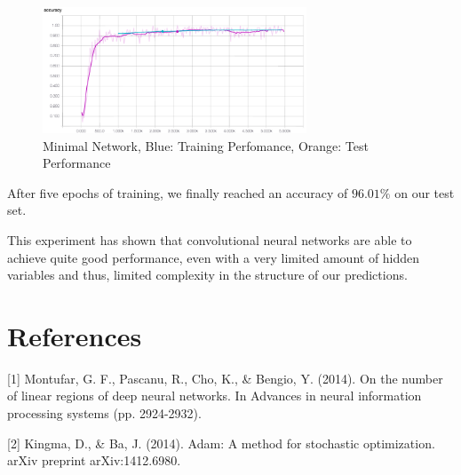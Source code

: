 \documentclass{article}
\begin{document}
\begin{figure}[h]
\centering
\includegraphics[width=0.7\textwidth]{imgs/acc_min.png}
\caption{Minimal Network, Blue: Training Perfomance, Orange: Test Performance}
\end{figure}

After five epochs of training, we finally reached an accuracy of $96.01\%$ on our test set.

This experiment has shown that convolutional neural networks are able to achieve quite good performance, even with a very limited amount of hidden variables and thus, limited complexity in the structure of our predictions.


\section*{References}

\small

[1] Montufar, G. F., Pascanu, R., Cho, K., \& Bengio, Y. (2014). On the number of linear regions of deep neural networks. In Advances in neural information processing systems (pp. 2924-2932).

[2] Kingma, D., \& Ba, J. (2014). Adam: A method for stochastic optimization. arXiv preprint arXiv:1412.6980.
\end{document}
